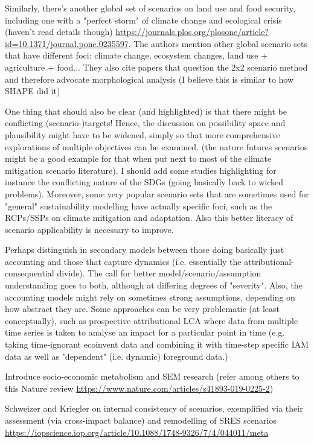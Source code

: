 \documentclass{article}
\begin{document}
Similarly, there's another global set of scenarios on land use and food security, including one with a "perfect storm" of climate change and ecological crisis (haven't read details though) \url{https://journals.plos.org/plosone/article?id=10.1371/journal.pone.0235597}. The authors mention other global scenario sets that have different foci: climate change, ecosystem changes, land use + agriculture + food... They also cite papers that question the 2x2 scenario method and therefore advocate morphological analysis (I believe this is similar to how SHAPE did it)

One thing that should also be clear (and highlighted) is that there might be conflicting (scenario-)targets! Hence, the discussion on possibility space and plausibility might have to be widened, simply so that more comprehensive explorations of multiple objectives can be examined. (the nature futures scenarios might be a good example for that when put next to most of the climate mitigation scenario literature). I should add some studies highlighting for instance the conflicting nature of the SDGs (going basically back to wicked problems). Moreover, some very popular scenario sets that are sometimes used for "general" sustainability modelling have actually specific foci, such as the RCPs/SSPs on climate mitigation and adaptation. Also this better literacy of scenario applicability is necessary to improve.

Perhaps distinguish in secondary models between those doing basically just accounting and those that capture dynamics (i.e. essentially the attributional-consequential divide). The call for better model/scenario/assumption understanding goes to both, although at differing degrees of "severity". Also, the accounting models might rely on sometimes strong assumptions, depending on how abstract they are. Some approaches can be very problematic (at least conceptually), such as prospective attributional LCA where data from multiple time series is taken to analyse an impact for a particular point in time (e.g. taking time-ignorant ecoinvent data and combining it with time-step specific IAM data as well as "dependent" (i.e. dynamic) foreground data.)

Introduce socio-economic metabolism and SEM research (refer among others to this Nature review \url{https://www.nature.com/articles/s41893-019-0225-2})

Schweizer and Kriegler on internal consistency of scenarios, exemplified via their assessment (via cross-impact balance) and remodelling of SRES scenarios \url{https://iopscience.iop.org/article/10.1088/1748-9326/7/4/044011/meta}
\end{document}
